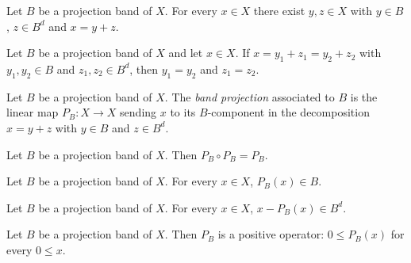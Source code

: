 \begin{lemma}
\label{lem:projectionBand-decomposition}
\leanok
{}
Let $B$ be a projection band of $X$. For every $x \in X$ there exist
$y, z \in X$ with $y \in B$, $z \in B^d$ and $x = y + z$.
\end{lemma}

\begin{lemma}
\label{lem:projectionBand-decomposition-unique}
\leanok
{}
Let $B$ be a projection band of $X$ and let $x \in X$. If $x = y_1 +
z_1 = y_2 + z_2$ with $y_1, y_2 \in B$ and $z_1, z_2 \in B^d$, then
$y_1 = y_2$ and $z_1 = z_2$.
\end{lemma}

\begin{definition}
\label{def:projectionBand-bandProjection}
\leanok
{}
Let $B$ be a projection band of $X$. The \emph{band projection}
associated to $B$ is the linear map $P_B \colon X \to X$ sending
$x$ to its $B$-component in the decomposition $x = y + z$ with
$y \in B$ and $z \in B^d$.
\end{definition}

\begin{lemma}
\label{lem:projectionBand-bandProjection-sq}
\leanok
{}
Let $B$ be a projection band of $X$. Then $P_B \circ P_B = P_B$.
\end{lemma}

\begin{lemma}
\label{lem:projectionBand-bandProjection-mem}
\leanok
{}
Let $B$ be a projection band of $X$. For every $x \in X$, $P_B(x) \in
B$.
\end{lemma}

\begin{lemma}
\label{lem:projectionBand-id-sub-bandProjection-mem}
\leanok
{}
Let $B$ be a projection band of $X$. For every $x \in X$, $x - P_B(x)
\in B^d$.
\end{lemma}

\begin{lemma}
\label{lem:projectionBand-bandProjection-nonneg}
\leanok
{}
Let $B$ be a projection band of $X$. Then $P_B$ is a positive
operator: $0 \le P_B(x)$ for every $0 \le x$.
\end{lemma}

